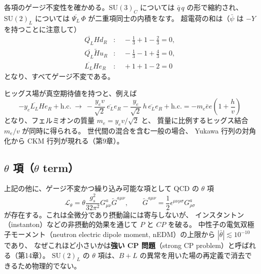 \documentclass[uplatex,dvipdfmx,a4paper,11pt,openany]{jsbook}
\newcommand{\term}[2]{\textbf{#1}（#2）}
\newcommand{\en}[1]{（#1）}
\numberwithin{equation}{chapter}
\theoremstyle{definition}
\theoremstyle{plain}
\theoremstyle{remark}
\newcommand{\Lag}{\mathcal{L}}
\newcommand{\SU}{\mathrm{SU}}
\newcommand{\hc}{\mathrm{h.c.}}
\begin{document}
各項のゲージ不変性を確かめる。$\SU(3)_C$ については $\bar q\,q$ の形で縮約され、
$\SU(2)_L$ については $\overline{\Psi_L}\,\Phi$ が二重項同士の内積をなす。
超電荷の和は（$\bar\psi$ は $-Y$ を持つことに注意して）
\begin{align}
\overline{Q_L}Hd_R&:\quad -\tfrac13+1-\tfrac23=0,\\
\overline{Q_L}\tilde Hu_R&:\quad -\tfrac13-1+\tfrac43=0,\\
\overline{L_L}He_R&:\quad +1+1-2=0
\end{align}
となり、すべてゲージ不変である。

ヒッグス場が真空期待値を持つと、例えば
\begin{equation}
-y_e\overline{L_L}He_R+\hc
\ \longrightarrow\
-\frac{y_ev}{\sqrt2}\,\overline{e_L}e_R-\frac{y_e}{\sqrt2}\,h\,\overline{e_L}e_R+\hc
=-m_e\bar ee\left(1+\frac hv\right)
\end{equation}
となり、フェルミオンの質量 $m_e=y_ev/\sqrt2$ と、
質量に比例するヒッグス結合 $m_e/v$ が同時に得られる。
世代間の混合を含む一般の場合、
Yukawa 行列の対角化から CKM 行列が現れる（第9章）。
\subsection{$\theta$ 項（$\theta$ term）}
上記の他に、ゲージ不変かつ繰り込み可能な項として
QCD の $\theta$ 項
\begin{equation}
\Lag_\theta=\theta\frac{g_s^2}{32\pi^2}G_{\mu\nu}^a\tilde G^{a\mu\nu},
\qquad
\tilde G^{a\mu\nu}=\frac12\epsilon^{\mu\nu\rho\sigma}G^a_{\rho\sigma}
\end{equation}
が存在する。これは全微分であり摂動論には寄与しないが、
インスタントン\en{instanton}などの非摂動的効果を通じて $P$ と $CP$ を破る。
中性子の電気双極子モーメント\en{neutron electric dipole moment, nEDM}の上限から $|\bar\theta|\lesssim10^{-10}$ であり、
なぜこれほど小さいかは\term{強い CP 問題}{strong CP problem}と呼ばれる（第14章）。
$\SU(2)_L$ の $\theta$ 項は、$B+L$ の異常を用いた場の再定義で消去できるため物理的でない。
\end{document}
